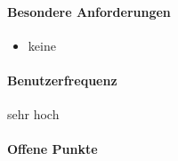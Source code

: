 \paragraph{Besondere Anforderungen}
\begin{itemize}
	\item keine
\end{itemize}

\paragraph{Benutzerfrequenz}
sehr hoch

\paragraph{Offene Punkte}

\newpage

